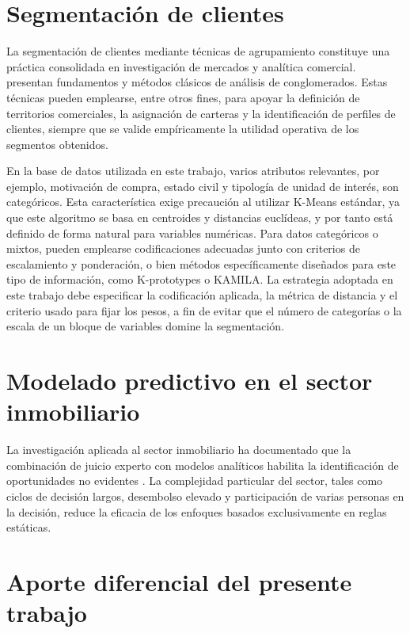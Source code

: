 \section{Segmentación de clientes}

La segmentación de clientes mediante técnicas de agrupamiento constituye una práctica consolidada en investigación de mercados y analítica comercial. \cite{kaufman1990finding} presentan fundamentos y métodos clásicos de análisis de conglomerados. Estas técnicas pueden emplearse, entre otros fines, para apoyar la definición de territorios comerciales, la asignación de carteras y la identificación de perfiles de clientes, siempre que se valide empíricamente la utilidad operativa de los segmentos obtenidos.

En la base de datos utilizada en este trabajo, varios atributos relevantes, por ejemplo, motivación de compra, estado civil y tipología de unidad de interés, son categóricos. Esta característica exige precaución al utilizar K-Means estándar, ya que este algoritmo se basa en centroides y distancias euclídeas, y por tanto está definido de forma natural para variables numéricas. Para datos categóricos o mixtos, pueden emplearse codificaciones adecuadas junto con criterios de escalamiento y ponderación, o bien métodos específicamente diseñados para este tipo de información, como K-prototypes o KAMILA. La estrategia adoptada en este trabajo debe especificar la codificación aplicada, la métrica de distancia y el criterio usado para fijar los pesos, a fin de evitar que el número de categorías o la escala de un bloque de variables domine la segmentación.

\section{Modelado predictivo en el sector inmobiliario}

La investigación aplicada al sector inmobiliario ha documentado que la combinación
de juicio experto con modelos analíticos habilita la identificación de
oportunidades no evidentes \cite{palmer2025bridging}. La complejidad
particular del sector, tales como ciclos de decisión largos, desembolso elevado y participación
de varias personas en la decisión, reduce la eficacia de los enfoques basados
exclusivamente en reglas estáticas.


\section{Aporte diferencial del presente trabajo}

